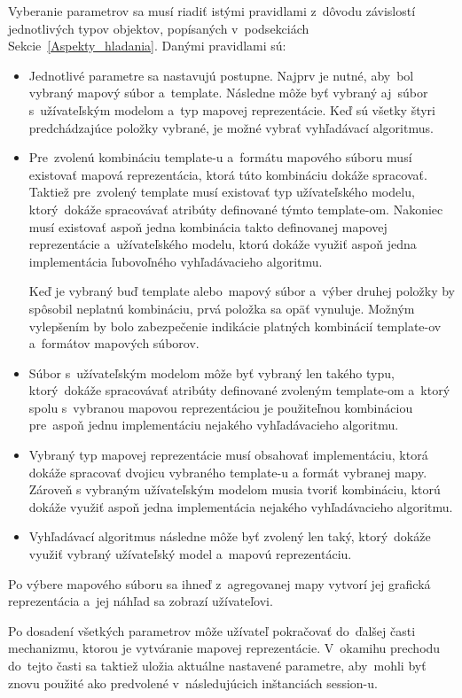 Vyberanie parametrov sa musí riadiť istými pravidlami z~dôvodu závislostí jednotlivých typov objektov, popísaných v~podsekciách Sekcie~\ref{Aspekty_hladania}. Danými pravidlami sú:
\begin{itemize}
    \item Jednotlivé parametre sa nastavujú postupne. Najprv je nutné, aby~bol vybraný mapový súbor a~template. Následne môže byť vybraný aj~súbor s~užívateľským modelom a~typ mapovej reprezentácie. Keď sú všetky štyri predchádzajúce položky vybrané, je možné vybrať vyhľadávací algoritmus. 
    \item Pre~zvolenú kombináciu template-u a~formátu mapového súboru musí existovať mapová reprezentácia, ktorá túto kombináciu dokáže spracovať. Taktiež pre~zvolený template musí existovať typ užívateľského modelu, ktorý~dokáže spracovávať atribúty definované týmto template-om. Nakoniec musí existovať aspoň jedna kombinácia takto definovanej mapovej reprezentácie a~užívateľského modelu, ktorú dokáže využiť aspoň jedna implementácia ľubovoľného vyhľadávacieho algoritmu.   
    
    Keď je vybraný buď template alebo~mapový súbor a~výber druhej položky by spôsobil neplatnú kombináciu, prvá položka sa opäť vynuluje. Možným vylepšením by bolo zabezpečenie indikácie platných kombinácií template-ov a~formátov mapových súborov.
    \item Súbor s~užívateľským modelom môže byť vybraný len takého typu, ktorý~dokáže spracovávať atribúty definované zvoleným template-om a~ktorý spolu s~vybranou mapovou reprezentáciou je použiteľnou kombináciou pre~aspoň jednu implementáciu nejakého vyhľadávacieho algoritmu. 
    \item Vybraný typ mapovej reprezentácie musí obsahovať implementáciu, ktorá dokáže spracovať dvojicu vybraného template-u a formát vybranej mapy. Zároveň s vybraným užívateľským modelom musia tvoriť kombináciu, ktorú dokáže využiť aspoň jedna implementácia nejakého vyhľadávacieho algoritmu.
    \item Vyhľadávací algoritmus následne môže byť zvolený len taký, ktorý~dokáže využiť vybraný užívateľský model a~mapovú reprezentáciu.
\end{itemize}    

Po výbere mapového súboru sa ihneď z~agregovanej mapy vytvorí jej grafická reprezentácia a~jej náhľad sa zobrazí užívateľovi.

Po dosadení všetkých parametrov môže užívateľ pokračovať do~ďalšej časti mechanizmu, ktorou je vytváranie mapovej reprezentácie. V~okamihu prechodu do~tejto časti sa taktiež uložia aktuálne nastavené parametre, aby~mohli byť znovu použité ako predvolené v~následujúcich inštanciách session-u. 

